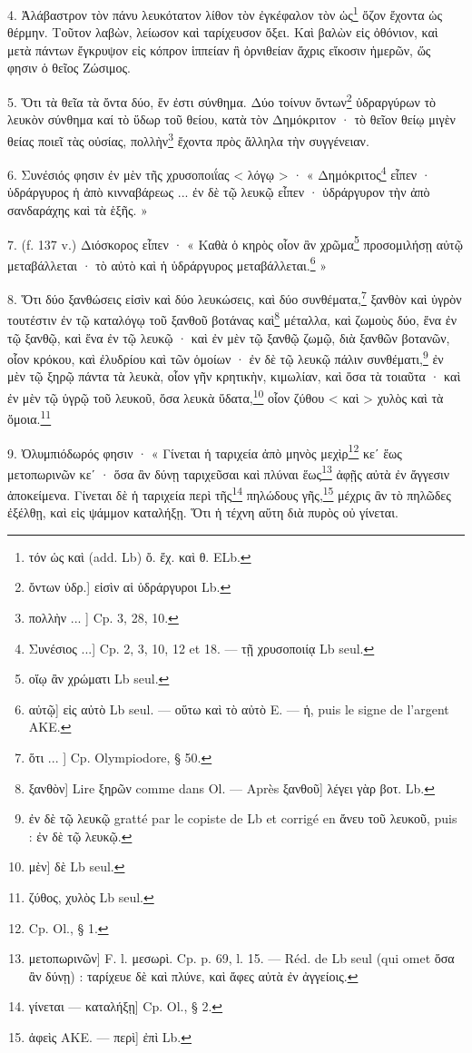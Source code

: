 \documentclass[a4paper, 11pt, oneside, polutonikogreek, french]{article}
\begin{document}
4. Ἀλάβαστρον τὸν πάνυ λευκότατον λίθον τὸν ἐγκέφαλον τὸν ὡς\footnote{τόν ὡς καὶ (add. Lb) ὄ. ἔχ. καὶ θ. ELb.} ὄζον ἔχοντα ὡς θέρμην. Τοῦτον λαβὼν, λείωσον καὶ ταρίχευσον ὄξει. Καὶ βαλὼν εἰς ὀθόνιον, καὶ μετὰ πάντων ἔγκρυψον εἰς κόπρον ἱππείαν ἢ ὀρνιθείαν ἄχρις εἴκοσιν ἡμερῶν, ὥς φησιν ὁ θεῖος Ζώσιμος.

5. Ὅτι τὰ θεῖα τὰ ὄντα δύο, ἕν ἐστι σύνθημα. Δύο τοίνυν ὄντων\footnote{ὄντων ὑδρ.] εἰσὶν αἱ ὑδράργυροι Lb.} ὑδραργύρων τὸ λευκὸν σύνθημα καί τὸ ὕδωρ τοῦ θείου, κατὰ τὸν Δημόκριτον · τὸ θεῖον θείῳ μιγὲν θείας ποιεῖ τὰς οὐσίας, πολλὴν\footnote{πολλὴν ... ] Cp. 3, 28, 10.} ἔχοντα πρὸς ἄλληλα τὴν συγγένειαν.

6. Συνέσιός φησιν ἐν μὲν τῆς χρυσοποιΐας < λόγῳ > · « Δημόκριτος\footnote{Συνέσιος ...] Cp. 2, 3, 10, 12 et 18. --- τῇ χρυσοποιίᾳ Lb seul.} εἶπεν · ὑδράργυρος ἡ ἀπὸ κινναβάρεως ... ἐν δὲ τῷ λευκῷ εἶπεν · ὑδράργυρον τὴν ἀπὸ σανδαράχης καὶ τὰ ἑξῆς. »

7. (f. 137 v.) Διόσκορος εἶπεν · « Καθὰ ὁ κηρὸς οἷον ἂν χρῶμα\footnote{οἵῳ ἂν χρώματι Lb seul.} προσομιλήσῃ αὐτῷ μεταβάλλεται · τὸ αὐτὸ καὶ ἡ ὑδράργυρος μεταβάλλεται.\footnote{αὐτῷ] εἰς αὐτὸ Lb seul. --- οὕτω καὶ τὸ αὐτὸ E. --- ἡ, puis le signe de l'argent AKE.} »

8. Ὅτι δύο ξανθώσεις εἰσὶν καὶ δύο λευκώσεις, καὶ δύο συνθέματα,\footnote{ὅτι ... ] Cp. Olympiodore, § 50.} ξανθὸν καὶ ὑγρὸν τουτέστιν ἐν τῷ καταλόγῳ τοῦ ξανθοῦ βοτάνας καὶ\footnote{ξανθὸν] Lire ξηρῶν comme dans Ol. --- Après ξανθοῦ] λέγει γὰρ βοτ. Lb.} μέταλλα, καὶ ζωμοὺς δύο, ἕνα ἐν τῷ ξανθῷ, καὶ ἕνα ἐν τῷ λευκῷ · καὶ ἐν μὲν τῷ ξανθῷ ζωμῷ, διὰ ξανθῶν βοτανῶν, οἷον κρόκου, καὶ ἐλυδρίου καὶ τῶν ὁμοίων · ἐν δὲ τῷ λευκῷ πάλιν συνθέματι,\footnote{ἐν δὲ τῷ λευκῷ gratté par le copiste de Lb et corrigé en ἄνευ τοῦ λευκοῦ, puis : ἐν δὲ τῷ λευκῷ.} ἐν μὲν τῷ ξηρῷ πάντα τὰ λευκὰ, οἷον γῆν κρητικὴν, κιμωλίαν, καὶ ὅσα τὰ τοιαῦτα · καὶ ἐν μὲν τῷ ὑγρῷ τοῦ λευκοῦ, ὅσα λευκὰ ὕδατα,\footnote{μὲν] δὲ Lb seul.} οἷον ζύθου < καὶ > χυλὸς καὶ τὰ ὅμοια.\footnote{ζύθος, χυλὸς Lb seul.}

9. Ὀλυμπιόδωρός φησιν · « Γίνεται ἡ ταριχεία ἀπὸ μηνὸς μεχὶρ\footnote{Cp. Ol., § 1.} κεʹ ἕως μετοπωρινῶν κεʹ · ὅσα ἂν δύνῃ ταριχεῦσαι καὶ πλύναι ἕως\footnote{μετοπωρινῶν] F. l. μεσωρὶ. Cp. p. 69, l. 15. --- Réd. de Lb seul (qui omet ὅσα ἂν δύνῃ) : ταρίχευε δὲ καὶ πλύνε, καὶ ἄφες αὐτὰ ἐν ἀγγείοις.} ἀφῇς αὐτὰ ἐν ἄγγεσιν ἀποκείμενα. Γίνεται δὲ ἡ ταριχεία περὶ τῆς\footnote{γίνεται --- καταλήξῃ] Cp. Ol., § 2.} πηλώδους γῆς,\footnote{ἀφεὶς AKE. --- περὶ] ἐπὶ Lb.} μέχρις ἂν τὸ πηλῶδες ἐξέλθῃ, καὶ εἰς ψάμμον καταλήξῃ. Ὅτι ἡ τέχνη αὕτη διὰ πυρὸς οὐ γίνεται.
\end{document}
